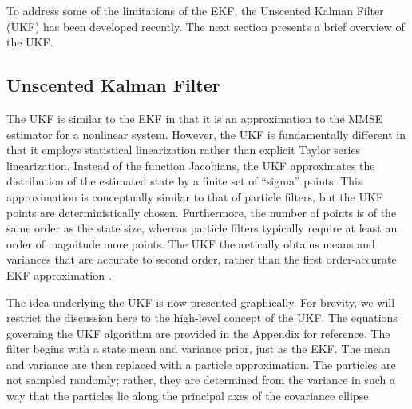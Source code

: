 To address some of the limitations of the EKF, the Unscented Kalman Filter (UKF) has been developed recently.
The next section presents a brief overview of the UKF.

\subsection{Unscented Kalman Filter}

The UKF is similar to the EKF in that it is an approximation to the MMSE estimator for a nonlinear system.
However, the UKF is fundamentally different in that it employs statistical linearization rather than explicit Taylor series linearization.
Instead of the function Jacobians, the UKF approximates the distribution of the estimated state by a finite set of ``sigma'' points.
This approximation is conceptually similar to that of particle filters, but the UKF points are deterministically chosen. Furthermore, the number of points is of the same order as the state size, whereas particle filters typically require at least an order of magnitude more points.
The UKF theoretically obtains means and variances that are accurate to second order, rather than the first order-accurate EKF approximation \cite{julier1997}.

The idea underlying the UKF is now presented graphically.
For brevity, we will restrict the discussion here to the high-level concept of the UKF.
The equations governing the UKF algorithm are provided in the Appendix for reference.
The filter begins with a state mean and variance prior, just as the EKF.
The mean and variance are then replaced with a particle approximation.
The particles are not sampled randomly; rather, they are determined from the variance in such a way that the particles lie along the principal axes of the covariance ellipse.

